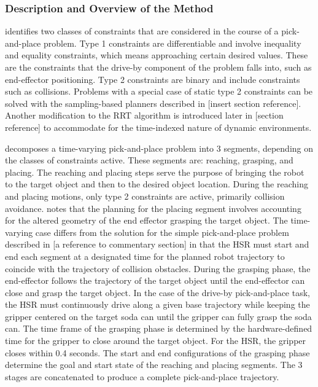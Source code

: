 \documentclass[12pt]{article}
\begin{document}
        \subsubsection{Description and Overview of the Method}
            \cite{yang_planning_2018} identifies two classes of constraints that are considered in the course of a pick-and-place problem. Type 1 constraints are differentiable and involve inequality and equality constraints, which means approaching certain desired values. These are the constraints that the drive-by component of the problem falls into, such as end-effector positioning. Type 2 constraints are binary and include constraints such as collisions. Problems with a special case of static type 2 constraints can be solved with the sampling-based planners described in [insert section reference]. Another modification to the RRT algorithm is introduced later in [section reference] to accommodate for the time-indexed nature of dynamic environments.

            \par \cite{yang_planning_2018} decomposes a time-varying pick-and-place problem into 3 segments, depending on the classes of constraints active. These segments are: reaching, grasping, and placing. The reaching and placing steps serve the purpose of bringing the robot to the target object and then to the desired object location. During the reaching and placing motions, only type 2 constraints are active, primarily collision avoidance. \cite{yang_planning_2018} notes that the planning for the placing segment involves accounting for the altered geometry of the end effector grasping the target object. The time-varying case differs from the solution for the simple pick-and-place problem described in [a reference to commentary section] in that the HSR must start and end each segment at a designated time for the planned robot trajectory to coincide with the trajectory of collision obstacles. During the grasping phase, the end-effector follows the trajectory of the target object until the end-effector can close and grasp the target object. In the case of the drive-by pick-and-place task, the HSR must continuously drive along a given base trajectory while keeping the gripper centered on the target soda can until the gripper can fully grasp the soda can. The time frame of the grasping phase is determined by the hardware-defined time for the gripper to close around the target object. For the HSR, the gripper closes within 0.4 seconds. The start and end configurations of the grasping phase determine the goal and start state of the reaching and placing segments. The 3 stages are concatenated to produce a complete pick-and-place trajectory.
\end{document}
